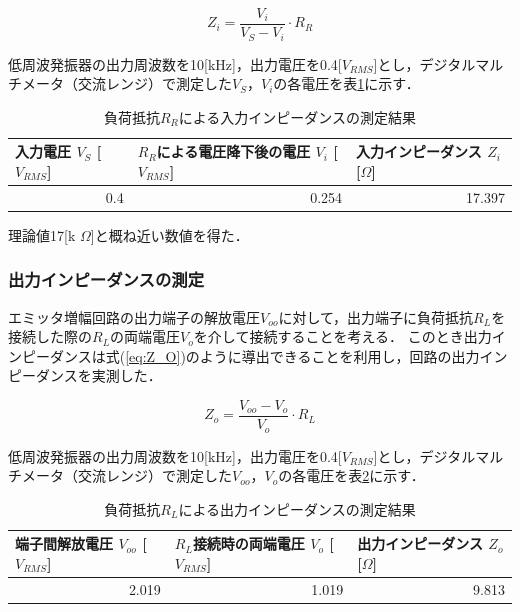 \documentclass[dvipdfmx,titlepage,a4j]{jsarticle}  %
\numberwithin{equation}{section}
\begin{document}
\begin{equation}
  Z_i = \frac{V_i}{V_S - V_i} \cdot R_R
  \label{eq:Z_I}
\end{equation}

低周波発振器の出力周波数を10[kHz]，出力電圧を0.4[$V_{RMS}$]とし，デジタルマルチメータ（交流レンジ）で測定した$V_S$，$V_i$の各電圧を表\ref{tbl:res;Z_I}に示す．

\begin{table}[H]
  \caption{負荷抵抗$R_R$による入力インピーダンスの測定結果}
  \begin{center}
    \begin{tabular}{l|l|l}
      \hline
      入力電圧 $V_S$ [$V_{RMS}$] & $R_R$による電圧降下後の電圧 $V_i$ [$V_{RMS}$] & 入力インピーダンス $Z_i$ [$\Omega$] \\ \hline\hline
      \multicolumn{1}{r|}{0.4}   & \multicolumn{1}{r|}{0.254}                    & \multicolumn{1}{r}{17.397}          \\ \hline
    \end{tabular}
  \end{center}
  \label{tbl:res;Z_I}
\end{table}

理論値17[k $\Omega$]と概ね近い数値を得た．

\subsubsection{出力インピーダンスの測定}
エミッタ増幅回路の出力端子の解放電圧$V_{oo}$に対して，出力端子に負荷抵抗$R_L$を接続した際の$R_L$の両端電圧$V_o$を介して接続することを考える．
このとき出力インピーダンスは式(\ref{eq:Z_O})のように導出できることを利用し，回路の出力インピーダンスを実測した．

\begin{equation}
  Z_o = \frac{V_{oo} - V_o}{V_o} \cdot R_L
  \label{eq:Z_O}
\end{equation}

低周波発振器の出力周波数を10[kHz]，出力電圧を0.4[$V_{RMS}$]とし，デジタルマルチメータ（交流レンジ）で測定した$V_{oo}$，$V_o$の各電圧を表\ref{tbl:res;Z_O}に示す．

\begin{table}[H]
  \caption{負荷抵抗$R_L$による出力インピーダンスの測定結果}
  \begin{center}
    \begin{tabular}{l|l|l}
      \hline
      端子間解放電圧 $V_{oo}$ [$V_{RMS}$] & $R_L$接続時の両端電圧 $V_o$ [$V_{RMS}$] & 出力インピーダンス $Z_o$ [$\Omega$] \\ \hline\hline
      \multicolumn{1}{r|}{2.019}          & \multicolumn{1}{r|}{1.019}              & \multicolumn{1}{r}{9.813}           \\ \hline
    \end{tabular}
  \end{center}
  \label{tbl:res;Z_O}
\end{table}
\end{document}
